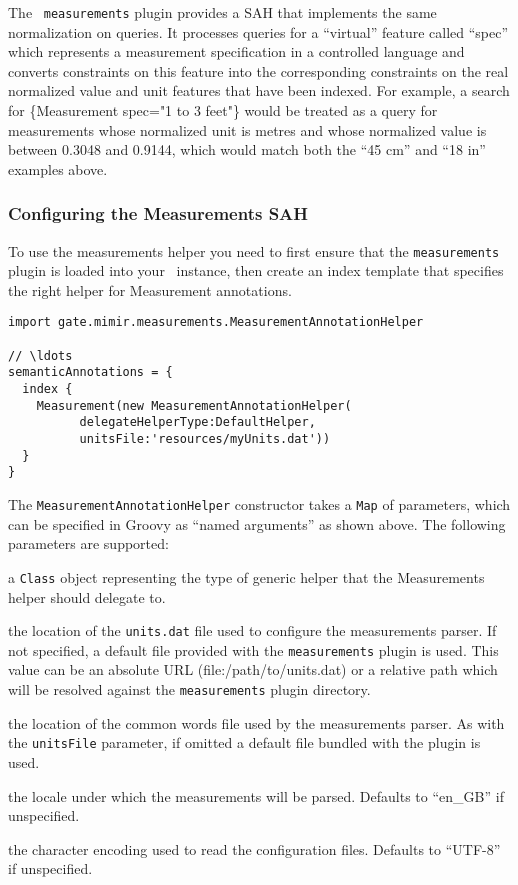 The \Mimir\ {\tt measurements} plugin provides a SAH that implements the same
normalization on queries.  It processes queries for a ``virtual'' feature
called ``spec'' which represents a measurement specification in a controlled
language and converts constraints on this feature into the corresponding
constraints on the real normalized value and unit features that have been
indexed.  For example, a search for \{Measurement spec="1 to 3 feet"\} would be
treated as a query for measurements whose normalized unit is metres and whose
normalized value is between 0.3048 and 0.9144, which would match both the ``45
cm'' and ``18 in'' examples above.

\subsubsection{Configuring the Measurements SAH}

To use the measurements helper you need to first ensure that the
{\tt measurements} plugin is loaded into your \Mimir\ instance, then create an
index template that specifies the right helper for Measurement annotations.
\begin{lstlisting}[texcl]
import gate.mimir.measurements.MeasurementAnnotationHelper

// \ldots
semanticAnnotations = {
  index {
    Measurement(new MeasurementAnnotationHelper(
          delegateHelperType:DefaultHelper,
          unitsFile:'resources/myUnits.dat'))
  }
}
\end{lstlisting}

The {\tt MeasurementAnnotationHelper} constructor takes a {\tt Map} of
parameters, which can be specified in Groovy as ``named arguments'' as shown
above.  The following parameters are supported:
\bde
\item[delegateHelperType (required)] a {\tt Class} object representing the type
of generic helper that the Measurements helper should delegate to.
\item[unitsFile] the location of the {\tt units.dat} file used to configure the
  measurements parser.  If not specified, a default file provided with the
  {\tt measurements} plugin is used.  This value can be an absolute URL
  (file:/path/to/units.dat) or a relative path which will be resolved against
  the {\tt measurements} plugin directory.
\item[commonWords] the location of the common words file used by the
  measurements parser.  As with the {\tt unitsFile} parameter, if omitted a
  default file bundled with the plugin is used.
\item[locale] the locale under which the measurements will be parsed.  Defaults
  to ``en\_GB'' if unspecified.
\item[encoding] the character encoding used to read the configuration files.
  Defaults to ``UTF-8'' if unspecified.
\ede

